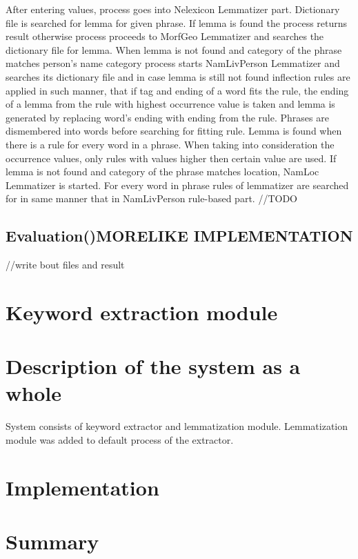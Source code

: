 \documentclass[12pt]{report}
\begin{document}
After entering values, process goes into Nelexicon Lemmatizer part. Dictionary file is searched for lemma for given phrase. If lemma is found the process returns result otherwise process proceeds to MorfGeo Lemmatizer and searches the dictionary file for lemma. When lemma is not found and category of the phrase matches person's name category process starts NamLivPerson Lemmatizer and searches its dictionary file and in case lemma is still not found inflection rules are applied in such manner, that if tag and ending of a word fits the rule, the ending of a lemma from the rule with highest occurrence value is taken and lemma is generated by replacing word's ending with ending from the rule. Phrases are dismembered into words before searching for fitting rule. Lemma is found when there is a rule for every word in a phrase. When taking into consideration the occurrence values, only rules with values higher then certain value are used. If lemma is not found and category of the phrase matches location, NamLoc Lemmatizer is started. For every word in phrase rules of lemmatizer are searched for in same manner that in NamLivPerson rule-based part.  //TODO 
\section{Evaluation()MORELIKE IMPLEMENTATION }
//write bout files and result 
\chapter{Keyword extraction module}
\chapter{Description of the system as a whole}
System consists of keyword extractor and lemmatization module. Lemmatization module was added to default process of the extractor.
\chapter{Implementation}
\chapter{Summary}
		
\listoftables
{}
\listoffigures
{}
% 			
\nocite{*}
%             

\end{document}
